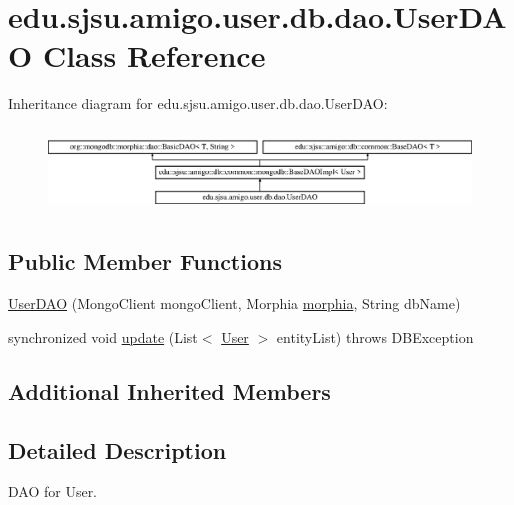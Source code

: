 \hypertarget{classedu_1_1sjsu_1_1amigo_1_1user_1_1db_1_1dao_1_1_user_d_a_o}{}\section{edu.\+sjsu.\+amigo.\+user.\+db.\+dao.\+User\+D\+AO Class Reference}
\label{classedu_1_1sjsu_1_1amigo_1_1user_1_1db_1_1dao_1_1_user_d_a_o}
Inheritance diagram for edu.\+sjsu.\+amigo.\+user.\+db.\+dao.\+User\+D\+AO\+:\begin{figure}[H]
\begin{center}
\leavevmode
\includegraphics[height=2.264151cm]{classedu_1_1sjsu_1_1amigo_1_1user_1_1db_1_1dao_1_1_user_d_a_o}
\end{center}
\end{figure}
\subsection*{Public Member Functions}
\begin{DoxyCompactItemize}
\item 
\hyperlink{classedu_1_1sjsu_1_1amigo_1_1user_1_1db_1_1dao_1_1_user_d_a_o_ac33b6189109b763990b7854c2e598e77}{User\+D\+AO} (Mongo\+Client mongo\+Client, Morphia \hyperlink{classedu_1_1sjsu_1_1amigo_1_1db_1_1common_1_1mongodb_1_1_base_d_a_o_impl_ac405c66365add92a549f7c386248fca4}{morphia}, String db\+Name)
\item 
synchronized void \hyperlink{classedu_1_1sjsu_1_1amigo_1_1user_1_1db_1_1dao_1_1_user_d_a_o_a1e1915a11af31352781c2f954fd39851}{update} (List$<$ \hyperlink{classedu_1_1sjsu_1_1amigo_1_1user_1_1db_1_1model_1_1_user}{User} $>$ entity\+List)  throws D\+B\+Exception 
\end{DoxyCompactItemize}
\subsection*{Additional Inherited Members}


\subsection{Detailed Description}
D\+AO for User.

